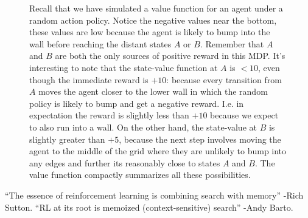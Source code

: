 \documentclass[12pt]{article}
\begin{document}
\begin{figure}[h]
  \centering
  \caption{\footnotesize Recall that we have simulated a value function for an agent under a random action policy. Notice the negative values near the bottom, these values are low because the agent is likely to bump into the wall before reaching the distant states $A$ or $B$. Remember that $A$ and $B$ are both the only sources of positive reward in this MDP. It's interesting to note that the state-value function at $A$ is $<10$, even though the immediate reward is $+10$: because every transition from $A$ moves the agent closer to the lower wall in which the random policy is likely to bump and get a negative reward. I.e. in expectation the reward is slightly less than $+10$ because we expect to also run into a wall. On the other hand, the state-value at $B$ is slightly greater than $+5$, because the next step involves moving the agent to the middle of the grid where they are unlikely to bump into any edges and further its reasonably close to states $A$ and $B$. The value function compactly summarizes all these possibilities.}
\end{figure}

``The essence of reinforcement learning is combining search with memory'' -Rich Sutton. ``RL at its root is memoized (context-sensitive) search'' -Andy Barto.
\end{document}
